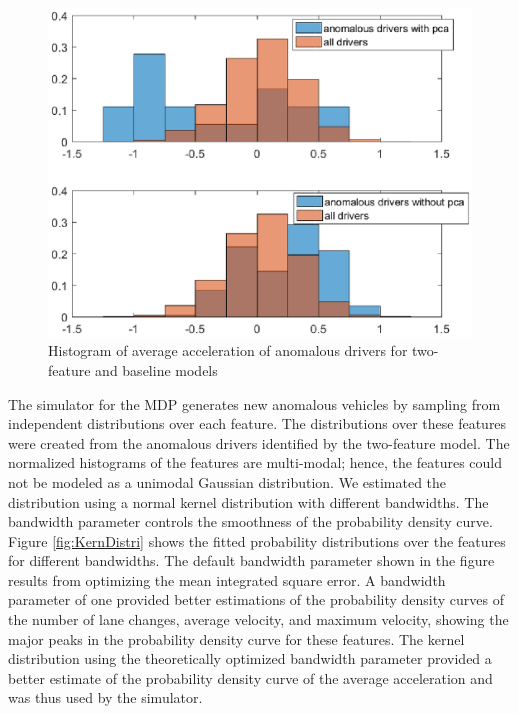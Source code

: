 \documentclass[10pt,journal]{IEEEtran}
\begin{document}
\begin{figure}[!t]
	\centering
    \includegraphics[width=0.9\columnwidth]{"Figures/avg_acceleration"}
	\caption{Histogram of average acceleration of anomalous drivers for two-feature and baseline models}
    \label{fig:AvgAccel}
\end{figure}

The simulator for the MDP generates new anomalous vehicles by sampling from independent distributions over each feature. The distributions over these features were created from the anomalous drivers identified by the two-feature model. The normalized histograms of the features are multi-modal; hence, the features could not be modeled as a unimodal Gaussian distribution. We estimated the distribution using a normal kernel distribution with different bandwidths. The bandwidth parameter controls the smoothness of the probability density curve. Figure \ref{fig:KernDistri} shows the fitted probability distributions over the features for different bandwidths. The default bandwidth parameter shown in the figure results from optimizing the mean integrated square error. A bandwidth parameter of one provided better estimations of the probability density curves of the number of lane changes, average velocity, and maximum velocity, showing the major peaks in the probability density curve for these features. The kernel distribution using the theoretically optimized bandwidth parameter provided a better estimate of the probability density curve of the average acceleration and was thus used by the simulator.
\end{document}
